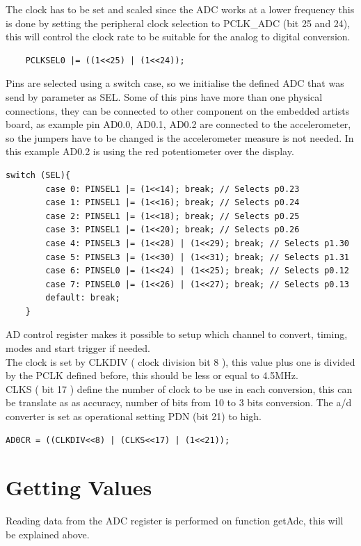 The clock has to be set and scaled since the ADC works at a lower frequency this is done by setting the peripheral clock selection to PCLK\_ADC (bit 25 and 24), this will control the clock rate to be suitable for the analog to digital conversion.
\begin{lstlisting} 
	PCLKSEL0 |= ((1<<25) | (1<<24));
 \end{lstlisting}


Pins are selected using a switch case, so we initialise the defined ADC that was send by parameter as SEL. Some of this pins have more than one physical connections, they can be connected to other component on the embedded artists board, as example pin AD0.0, AD0.1, AD0.2 are connected to the accelerometer, so the jumpers have to be changed is the accelerometer measure is not needed. In this example AD0.2 is using the red potentiometer over the display.

\begin{lstlisting}
switch (SEL){
		case 0: PINSEL1 |= (1<<14); break; // Selects p0.23
		case 1: PINSEL1 |= (1<<16); break; // Selects p0.24
		case 2: PINSEL1 |= (1<<18); break; // Selects p0.25
		case 3: PINSEL1 |= (1<<20); break; // Selects p0.26
		case 4: PINSEL3 |= (1<<28) | (1<<29); break; // Selects p1.30
		case 5: PINSEL3 |= (1<<30) | (1<<31); break; // Selects p1.31
		case 6: PINSEL0 |= (1<<24) | (1<<25); break; // Selects p0.12
		case 7: PINSEL0 |= (1<<26) | (1<<27); break; // Selects p0.13
		default: break;
	}
\end{lstlisting}


A\/D control register makes it possible to setup which channel to convert, timing, modes and start trigger if needed. \\
The clock is set by CLKDIV ( clock division bit 8 ), this value plus one is divided by the PCLK defined before, this should be less or equal to 4.5MHz. \\
CLKS ( bit 17 ) define the number of clock to be use in each conversion, this can be translate as as accuracy, number of bits from 10 to 3 bits conversion.
The a/d converter is set as operational setting PDN (bit 21) to high.

\begin{lstlisting}
AD0CR = ((CLKDIV<<8) | (CLKS<<17) | (1<<21));
\end{lstlisting}

\newpage

\section{Getting Values}
Reading data from the ADC register is performed on function getAdc, this will be explained above.

